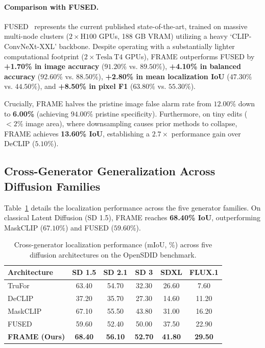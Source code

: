 \paragraph{Comparison with FUSED.} FUSED~\cite{fused} represents the current published state-of-the-art, trained on massive multi-node clusters ($2 \times \mathrm{H}100$ GPUs, 188 GB VRAM) utilizing a heavy `CLIP-ConvNeXt-XXL' backbone. Despite operating with a substantially lighter computational footprint ($2 \times \mathrm{Tesla\ T4}$ GPUs), FRAME outperforms FUSED by \textbf{+1.70\% in image accuracy} ($91.20\%$ vs. $89.50\%$), \textbf{+4.10\% in balanced accuracy} ($92.60\%$ vs. $88.50\%$), \textbf{+2.80\% in mean localization IoU} ($47.30\%$ vs. $44.50\%$), and \textbf{+8.50\% in pixel F1} ($63.80\%$ vs. $55.30\%$). 

Crucially, FRAME halves the pristine image false alarm rate from $12.00\%$ down to \textbf{6.00\%} (achieving $94.00\%$ pristine specificity). Furthermore, on tiny edits ($<2\%$ image area), where downsampling causes prior methods to collapse, FRAME achieves \textbf{13.60\% IoU}, establishing a $2.7\times$ performance gain over DeCLIP ($5.10\%$).

\subsection{Cross-Generator Generalization Across Diffusion Families}
Table~\ref{tab:generator_breakdown} details the localization performance across the five generator families. On classical Latent Diffusion (SD 1.5), FRAME reaches \textbf{68.40\% IoU}, outperforming MaskCLIP ($67.10\%$) and FUSED ($59.60\%$).

\begin{table}[t]
\centering\small
\caption{Cross-generator localization performance (mIoU, \%) across five diffusion architectures on the OpenSDID benchmark.}
\label{tab:generator_breakdown}
\begin{tabular}{@{}lccccc@{}}
\toprule
Architecture & SD 1.5 & SD 2.1 & SD 3 & SDXL & FLUX.1 \\
\midrule
TruFor~\cite{trufor} & 63.40 & 54.70 & 32.30 & 26.60 & 7.60 \\
DeCLIP~\cite{declip} & 37.20 & 35.70 & 27.30 & 14.60 & 11.20 \\
MaskCLIP~\cite{opensdi} & 67.10 & 55.50 & 43.80 & 31.00 & 16.20 \\
FUSED~\cite{fused} & 59.60 & 52.40 & 50.00 & 37.50 & 22.90 \\
\midrule
\textbf{FRAME (Ours)} & \textbf{68.40} & \textbf{56.10} & \textbf{52.70} & \textbf{41.80} & \textbf{29.50} \\
\bottomrule
\end{tabular}
\end{table}

